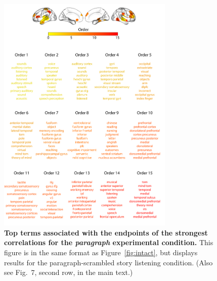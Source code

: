 \documentclass{article}
\newcommand{\neurosynth}{7}
\begin{document}
\begin{figure}[p!]
\centering
\includegraphics[width=0.75\textwidth]{figs/supp_15_paragraph}
\caption{\textbf{Top terms associated with the endpoints of the
    strongest correlations for the \textit{paragraph} experimental
    condition.}  This figure is in the same format as
  Figure~\ref{fig:intact}, but displays results for the
  paragraph-scrambled story listening condition.  (Also see Fig.~\neurosynth,
second row, in the main text.)}
\label{fig:paragraph}
\end{figure}
\end{document}
